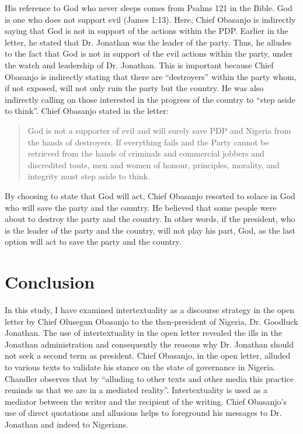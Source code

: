 \documentclass[output=paper,colorlinks,citecolor=brown]{langscibook}
\begin{document}
His reference to God who never sleeps comes from Psalms 121 in the Bible. God is one who does not support evil (James 1:13). Here, Chief Obasanjo is indirectly  saying that God is not in support of the actions within the PDP. Earlier in the letter, he stated that Dr. Jonathan was the leader of the party. Thus, he alludes  to the fact that God is not in support of the evil actions within the party,  under the watch and leadership of Dr. Jonathan. This is important because Chief Obasanjo is indirectly stating that there are “destroyers” within the party whom, if not exposed, will not only ruin the party but the country. He was also indirectly calling on those interested in the progress of the country to ``step aside to think''. Chief Obasanjo stated in the letter:

\begin{quote}
    God is not a supporter of evil and will surely save PDP and Nigeria from the hands of destroyers. If everything fails and the Party cannot be retrieved from the hands of criminals and commercial jobbers and discredited touts, men and women of honour, principles, morality, and integrity must step aside to think.
\end{quote}

By choosing to state that God will act, Chief Obasanjo resorted to solace in God who will save the party and the country. He believed that some people were about to destroy the party and the country. In other words, if the president, who is the leader of the party and the country, will not play his part, God, as the last option will act to save the party and the country. 

\section{Conclusion}

In this study, I have examined intertextuality as a discourse strategy in the open letter by Chief Olusegun Obasanjo to the then-president of Nigeria, Dr. Goodluck Jonathan. The use of intertextuality in the open letter revealed the ills in the Jonathan administration and consequently the reasons why Dr. Jonathan should not seek a second term as president. Chief Obasanjo, in the open letter, alluded to various texts to validate his stance on the state of governance in Nigeria. Chandler \citeyearpar[202]{Chandler2007} observes that by “alluding to other texts and other media this practice reminds us that we are in a mediated reality”. Intertextuality is used as a mediator between the writer and the recipient of the writing. Chief Obasanjo’s use of direct quotations and allusions helps to foreground his messages to Dr. Jonathan and indeed to Nigerians.
\end{document}

